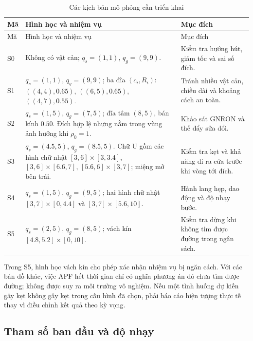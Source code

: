 \documentclass[12pt,a4paper,oneside]{report}
\numberwithin{equation}{chapter}
\begin{document}
\begin{longtable}{|>{\raggedright\arraybackslash}p{1.0cm}|>{\raggedright\arraybackslash}p{8.7cm}|>{\raggedright\arraybackslash}p{4.1cm}|}
\caption{Các kịch bản mô phỏng cần triển khai}\label{tab:scenarios}\\\hline
Mã & Hình học và nhiệm vụ & Mục đích\\\hline
\endfirsthead
\hline Mã & Hình học và nhiệm vụ & Mục đích\\\hline\endhead
S0 & Không có vật cản; $q_s=(1,1)$, $q_g=(9,9)$. & Kiểm tra hướng hút, giảm tốc và sai số đích.\\\hline
S1 & $q_s=(1,1)$, $q_g=(9,9)$; ba đĩa $(c_i,R_i)$: $((4,4),0.65)$, $((6,5),0.65)$, $((4,7),0.55)$. & Tránh nhiều vật cản, chiều dài và khoảng cách an toàn.\\\hline
S2 & $q_s=(1,5)$, $q_g=(7,5)$; đĩa tâm $(8,5)$, bán kính $0.50$. Đích hợp lệ nhưng nằm trong vùng ảnh hưởng khi $\rho_0=1$. & Khảo sát GNRON và thế đẩy sửa đổi.\\\hline
S3 & $q_s=(4.5,5)$, $q_g=(8.5,5)$. Chữ U gồm các hình chữ nhật $[3,6]\times[3,3.4]$, $[3,6]\times[6.6,7]$, $[5.6,6]\times[3,7]$; miệng mở bên trái. & Kiểm tra kẹt và khả năng đi ra cửa trước khi vòng tới đích.\\\hline
S4 & $q_s=(1,5)$, $q_g=(9,5)$; hai hình chữ nhật $[3,7]\times[0,4.4]$ và $[3,7]\times[5.6,10]$. & Hành lang hẹp, dao động và độ nhạy bước.\\\hline
S5 & $q_s=(2,5)$, $q_g=(8,5)$; vách kín $[4.8,5.2]\times[0,10]$. & Kiểm tra dừng khi không tìm được đường trong ngân sách.\\\hline
\end{longtable}

Trong S5, hình học vách kín cho phép xác nhận nhiệm vụ bị ngăn cách. Với các bản đồ khác, việc APF hết thời gian chỉ có nghĩa phương án đó chưa tìm được đường; không được suy ra môi trường vô nghiệm. Nếu một tình huống dự kiến gây kẹt không gây kẹt trong cấu hình đã chọn, phải báo cáo hiện tượng thực tế thay vì điều chỉnh kết quả theo kỳ vọng.

\subsection{Tham số ban đầu và độ nhạy}
\end{document}
